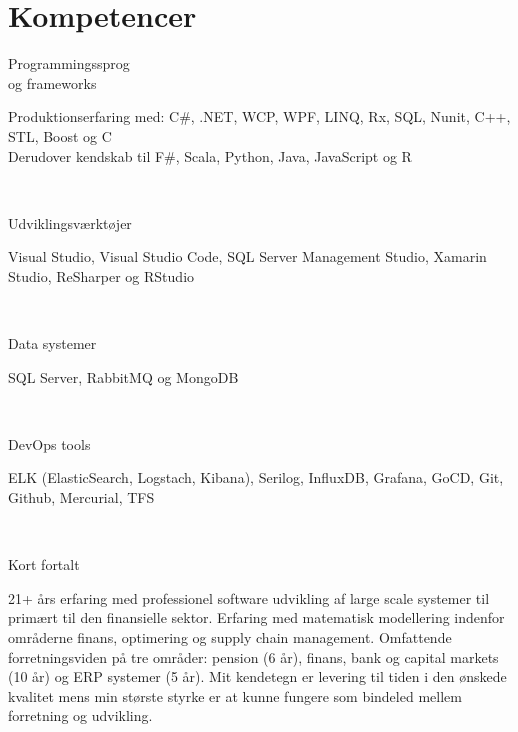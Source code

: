 \documentclass[10pt, a4paper]{article}
\begin{document}
\section{Kompetencer}
\begin{Row}%
  \begin{Cell}{1}
    Programmingssprog \\[1ex]
    og frameworks
  \end{Cell}
  \begin{Cell}{3}
    Produktionserfaring med: C\#, .NET, WCP, WPF, LINQ, Rx, SQL, Nunit,  %
    C++, STL, Boost og C \\
    Derudover kendskab til F\#, Scala, Python, Java, JavaScript og R
  \end{Cell}
\end{Row}
\\[0.5cm]
\begin{Row}%
  \begin{Cell}{1}
    Udviklingsværktøjer
  \end{Cell}
  \begin{Cell}{3}
    Visual Studio, Visual Studio Code, SQL Server Management Studio, Xamarin
    Studio, ReSharper og RStudio
  \end{Cell}
\end{Row}
\\[0.5cm]
\begin{Row}%
  \begin{Cell}{1}
    Data systemer
  \end{Cell}
  \begin{Cell}{3}
    SQL Server, RabbitMQ og MongoDB
  \end{Cell}
\end{Row}
\\[0.5cm]\begin{Row}%
  \begin{Cell}{1}
    DevOps tools
  \end{Cell}
  \begin{Cell}{3}
    ELK (ElasticSearch, Logstach, Kibana), Serilog, InfluxDB, Grafana, GoCD, Git, Github, Mercurial, TFS
  \end{Cell}
\end{Row}
\\[0.5cm]
\begin{Row}%
  \begin{Cell}{1}
    Kort fortalt
  \end{Cell}
  \begin{Cell}{3}
    21+ års erfaring med professionel software udvikling af large scale systemer
    til primært til den finansielle sektor. Erfaring med matematisk modellering
    indenfor områderne finans, optimering og supply chain management. Omfattende
    forretningsviden på tre områder: pension (6 år), finans, bank og capital
    markets (10 år) og ERP systemer (5 år). Mit kendetegn er levering til tiden
    i den ønskede kvalitet mens min største styrke er at kunne fungere som
    bindeled mellem forretning og udvikling.
  \end{Cell}
\end{Row}
\end{document}
